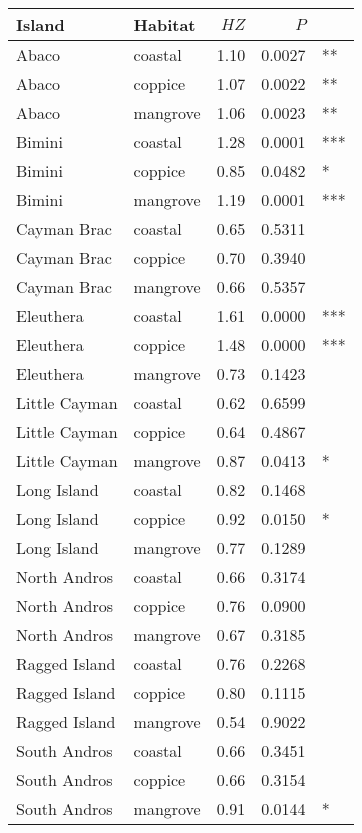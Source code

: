 
\begin{tabular}{llrrl}
\toprule
Island & Habitat & $HZ$ & $P$ & \\
\midrule
Abaco & coastal & 1.10 & 0.0027 & **\\
Abaco & coppice & 1.07 & 0.0022 & **\\
Abaco & mangrove & 1.06 & 0.0023 & **\\
Bimini & coastal & 1.28 & 0.0001 & ***\\
Bimini & coppice & 0.85 & 0.0482 & *\\
Bimini & mangrove & 1.19 & 0.0001 & ***\\
Cayman Brac & coastal & 0.65 & 0.5311 & \\
Cayman Brac & coppice & 0.70 & 0.3940 & \\
Cayman Brac & mangrove & 0.66 & 0.5357 & \\
Eleuthera & coastal & 1.61 & 0.0000 & ***\\
Eleuthera & coppice & 1.48 & 0.0000 & ***\\
Eleuthera & mangrove & 0.73 & 0.1423 & \\
Little Cayman & coastal & 0.62 & 0.6599 & \\
Little Cayman & coppice & 0.64 & 0.4867 & \\
Little Cayman & mangrove & 0.87 & 0.0413 & *\\
Long Island & coastal & 0.82 & 0.1468 & \\
Long Island & coppice & 0.92 & 0.0150 & *\\
Long Island & mangrove & 0.77 & 0.1289 & \\
North Andros & coastal & 0.66 & 0.3174 & \\
North Andros & coppice & 0.76 & 0.0900 & \\
North Andros & mangrove & 0.67 & 0.3185 & \\
Ragged Island & coastal & 0.76 & 0.2268 & \\
Ragged Island & coppice & 0.80 & 0.1115 & \\
Ragged Island & mangrove & 0.54 & 0.9022 & \\
South Andros & coastal & 0.66 & 0.3451 & \\
South Andros & coppice & 0.66 & 0.3154 & \\
South Andros & mangrove & 0.91 & 0.0144 & *\\
\bottomrule
\end{tabular}
